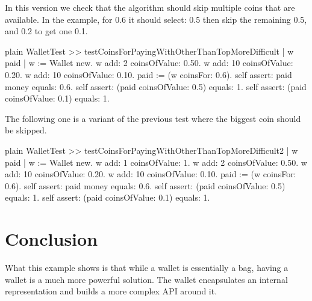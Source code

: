 \documentclass[10pt,twoside,english]{_support/latex/sbabook/sbabook}
\begin{document}
In this version we check that the algorithm should skip multiple coins that are available. In the example, for 0.6 it should select: 0.5 then skip the remaining 0.5, and 0.2 to get one 0.1.

\begin{displaycode}{plain}
WalletTest >> testCoinsForPayingWithOtherThanTopMoreDifficult
	| w paid | 
	w := Wallet new.
	w add: 2 coinsOfValue: 0.50.
	w add: 10 coinsOfValue: 0.20.
	w add: 10 coinsOfValue: 0.10.
	paid := (w coinsFor: 0.6).
	self assert: paid money equals: 0.6.
	self assert: (paid coinsOfValue: 0.5) equals: 1.
	self assert: (paid coinsOfValue: 0.1) equals: 1.
\end{displaycode}

The following one is a variant of the previous test where the biggest coin should be skipped. 

\begin{displaycode}{plain}
WalletTest >> testCoinsForPayingWithOtherThanTopMoreDifficult2
	| w paid | 
	w := Wallet new.
	w add: 1 coinsOfValue: 1.
	w add: 2 coinsOfValue: 0.50.
	w add: 10 coinsOfValue: 0.20.
	w add: 10 coinsOfValue: 0.10.
	paid := (w coinsFor: 0.6).
	self assert: paid money equals: 0.6.
	self assert: (paid coinsOfValue: 0.5) equals: 1.
	self assert: (paid coinsOfValue: 0.1) equals: 1.
\end{displaycode}
\section{Conclusion}
What this example shows is that while a wallet is essentially a bag, having a wallet is a much more powerful solution.
The wallet encapsulates an internal representation and builds a more complex API around it. 



\backmatter



\end{document}
